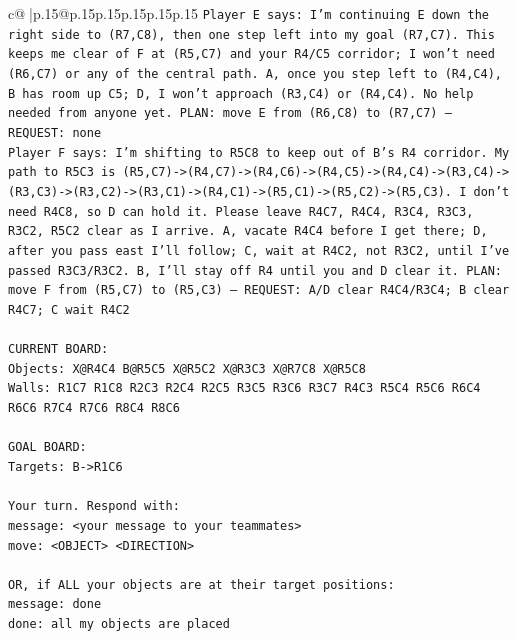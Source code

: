 \documentclass{article}
\begin{document}
{\begin{supertabular}{c@{$\;$}|p{.15\linewidth}@{}p{.15\linewidth}p{.15\linewidth}p{.15\linewidth}p{.15\linewidth}p{.15\linewidth}}
{{{\texttt{Player E says: I'm continuing E down the right side to (R7,C8), then one step left into my goal (R7,C7). This keeps me clear of F at (R5,C7) and your R4/C5 corridor; I won't need (R6,C7) or any of the central path. A, once you step left to (R4,C4), B has room up C5; D, I won't approach (R3,C4) or (R4,C4). No help needed from anyone yet. PLAN: move E from (R6,C8) to (R7,C7) — REQUEST: none} \\
\texttt{Player F says: I'm shifting to R5C8 to keep out of B's R4 corridor. My path to R5C3 is (R5,C7){-}>(R4,C7){-}>(R4,C6){-}>(R4,C5){-}>(R4,C4){-}>(R3,C4){-}>(R3,C3){-}>(R3,C2){-}>(R3,C1){-}>(R4,C1){-}>(R5,C1){-}>(R5,C2){-}>(R5,C3). I don't need R4C8, so D can hold it. Please leave R4C7, R4C4, R3C4, R3C3, R3C2, R5C2 clear as I arrive. A, vacate R4C4 before I get there; D, after you pass east I'll follow; C, wait at R4C2, not R3C2, until I've passed R3C3/R3C2. B, I'll stay off R4 until you and D clear it. PLAN: move F from (R5,C7) to (R5,C3) — REQUEST: A/D clear R4C4/R3C4; B clear R4C7; C wait R4C2} \\
\\ 
\texttt{CURRENT BOARD:} \\
\texttt{Objects: X@R4C4 B@R5C5 X@R5C2 X@R3C3 X@R7C8 X@R5C8} \\
\texttt{Walls: R1C7 R1C8 R2C3 R2C4 R2C5 R3C5 R3C6 R3C7 R4C3 R5C4 R5C6 R6C4 R6C6 R7C4 R7C6 R8C4 R8C6} \\
\\ 
\texttt{GOAL BOARD:} \\
\texttt{Targets: B{-}>R1C6} \\
\\ 
\texttt{Your turn. Respond with:} \\
\texttt{message: <your message to your teammates>} \\
\texttt{move: <OBJECT> <DIRECTION>} \\
\\ 
\texttt{OR, if ALL your objects are at their target positions:} \\
\texttt{message: done} \\
\texttt{done: all my objects are placed} \\
            }
        }
    }
     \\ \\


\end{supertabular}}
\end{document}
